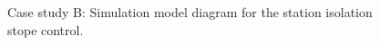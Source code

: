 \begin{appendices}
	\begin{figure}[h]
		\centering
		\caption{Case study B: Simulation model diagram for the station isolation stope control.}
		\label{fig: Stope layout}
	\end{figure}

\end{appendices}
